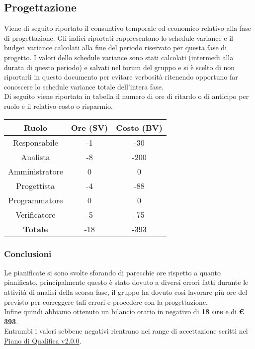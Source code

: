\documentclass{scalatekids-article}
\begin{document}
\subsection{Progettazione}
Viene di seguito riportato il consuntivo temporale ed economico relativo alla fase di progettazione. Gli indici riportati rappresentano lo schedule variance e il budget variance calcolati alla fine del periodo riservato per questa fase di progetto. I valori dello schedule variance sono stati calcolati (intermedi alla durata di questo periodo) e salvati nel forum del gruppo e si è scelto di non riportarli in questo documento per evitare verbosità ritenendo opportuno far conoscere lo schedule variance totale dell'intera fase.\\
Di seguito viene riportata in tabella il numero di ore di ritardo o di anticipo per ruolo e il relativo costo o risparmio.
\begin{center}
  \normalsize
  \begin{tabular}{| c | c | c |}
    \hline
    \textbf{Ruolo} & \textbf{Ore (SV)} & \textbf{Costo (BV)}\\
    \hline
    Responsabile & -1 & -30 \\
    Analista & -8 & -200\\
    Amministratore & 0 & 0\\
    Progettista & -4 & -88\\
    Programmatore & 0 & 0\\
    Verificatore & -5 & -75\\
    \hline
    \textbf{Totale} & -18 & -393\\
    \hline
  \end{tabular}
\end{center}

\subsubsection{Conclusioni}
Le  pianificate si sono svolte sforando di parecchie ore rispetto a quanto pianificato, principalmente questo è stato dovuto a diversi errori fatti durante le attività di analisi della scorsa fase, il gruppo ha dovuto così lavorare più ore del previsto per correggere tali errori e procedere con la progettazione.\\Infine quindi abbiamo ottenuto un bilancio orario in negativo di \textbf{18 ore} e di \textbf{\euro{} 393}.\\ Entrambi i valori sebbene negativi rientrano nei range di accettazione scritti nel \href{run:PianoDiQualifica\_v2.0.0.pdf}{Piano di Qualifica v2.0.0}.
\end{document}
